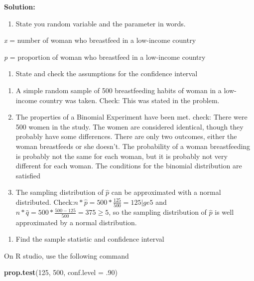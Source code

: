 \documentclass[]{book}
\newenvironment{Shaded}{\begin{snugshade}}{\end{snugshade}}
\newcommand{\DataTypeTok}[1]{\textcolor[rgb]{0.13,0.29,0.53}{#1}}
\newcommand{\DecValTok}[1]{\textcolor[rgb]{0.00,0.00,0.81}{#1}}
\newcommand{\FloatTok}[1]{\textcolor[rgb]{0.00,0.00,0.81}{#1}}
\newcommand{\KeywordTok}[1]{\textcolor[rgb]{0.13,0.29,0.53}{\textbf{#1}}}
\newcommand{\NormalTok}[1]{#1}
\providecommand{\tightlist}{%
  \setlength{\itemsep}{0pt}\setlength{\parskip}{0pt}}
\begin{document}
\textbf{Solution:}

\begin{enumerate}
\def\labelenumi{\arabic{enumi}.}
\tightlist
\item
  State you random variable and the parameter in words.
\end{enumerate}

\emph{x} = number of woman who breastfeed in a low-income country

\emph{p} = proportion of woman who breastfeed in a low-income country

\begin{enumerate}
\def\labelenumi{\arabic{enumi}.}
\setcounter{enumi}{1}
\tightlist
\item
  State and check the assumptions for the confidence interval
\end{enumerate}

\begin{enumerate}
\def\labelenumi{\alph{enumi}.}
\item
  A simple random sample of 500 breastfeeding habits of woman in a low-income country was taken. Check: This was stated in the problem.
\item
  The properties of a Binomial Experiment have been met. check: There were 500 women in the study. The women are considered identical, though they probably have some differences. There are only two outcomes, either the woman breastfeeds or she doesn't. The probability of a woman breastfeeding is probably not the same for each woman, but it is probably not very different for each woman. The conditions for the binomial distribution are satisfied
\item
  The sampling distribution of \(\hat{p}\) can be approximated with a normal distributed. Check:\(n*\hat{p}= 500*\frac{125}{500}=125|ge5\) and \(n*\hat{q}=500*\frac{500-125}{500}=375\ge5\), so the sampling distribution of \(\hat{p}\) is well approximated by a normal distribution.
\end{enumerate}

\begin{enumerate}
\def\labelenumi{\arabic{enumi}.}
\setcounter{enumi}{3}
\tightlist
\item
  Find the sample statistic and confidence interval
\end{enumerate}

On R studio, use the following command

\begin{Shaded}
\begin{Highlighting}[]
\KeywordTok{prop.test}\NormalTok{(}\DecValTok{125}\NormalTok{, }\DecValTok{500}\NormalTok{, }\DataTypeTok{conf.level =} \FloatTok{.90}\NormalTok{)}
\end{Highlighting}
\end{Shaded}
\end{document}
